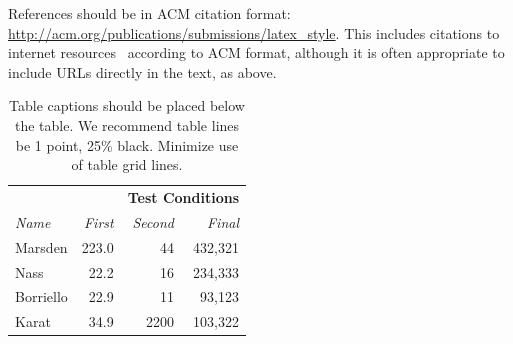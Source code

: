 \documentclass{sigchi}
\begin{document}
References should be in ACM citation format:
\url{http://acm.org/publications/submissions/latex_style}. This
includes citations to internet
resources~\cite{acm_categories,cavender:writing,CHINOSAUR:venue,psy:gangnam}
according to ACM format, although it is often appropriate to include
URLs directly in the text, as above.




\begin{table}
  \centering
  \begin{tabular}{l r r r}
    & & \multicolumn{2}{c}{\small{\textbf{Test Conditions}}} \\
    \cmidrule(r){3-4}
    {\small\textit{Name}}
    & {\small \textit{First}}
      & {\small \textit{Second}}
    & {\small \textit{Final}} \\
    \midrule
    Marsden & 223.0 & 44 & 432,321 \\
    Nass & 22.2 & 16 & 234,333 \\
    Borriello & 22.9 & 11 & 93,123 \\
    Karat & 34.9 & 2200 & 103,322 \\
  \end{tabular}
  \caption{Table captions should be placed below the table. We
    recommend table lines be 1 point, 25\% black. Minimize use of
    table grid lines.}~\label{tab:table1}
\end{table}
\end{document}
